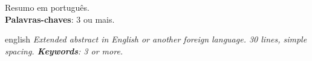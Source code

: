 \documentclass[12pt,openright,oneside,a4paper,english,french,spanish,brazil]{unifil}
\begin{document}
\par
\begin{resumo}
Resumo em português.
\vspace{\onelineskip} \\
\noindent
\textbf{Palavras-chaves}: 3 ou mais.
\end{resumo}

\par
\begin{resumo}[Abstract]
\begin{otherlanguage*}{english}
\emph{
Extended abstract in English or another foreign language. 30 lines, simple spacing. \citeyear{ABNTEX2:2014}
}
\vspace{\onelineskip}
\noindent
\emph{	
\textbf{Keywords}: 3 or more.
}
\end{otherlanguage*}
\end{resumo}


\tableofcontents*

  \setlength\absleftindent{0cm}
  \setlength\absrightindent{0cm}
  
  \abstracttextfont{\normalfont\normalsize}

  \setlength{\absparindent}{0pt}
  \setlength{\absparsep}{18pt}


\textual

\renewcommand{\ABNTEXchapterfont}{\fontfamily{cmr}\fontseries{b}\selectfont}
\renewcommand{\ABNTEXchapterfontsize}{\Large}

\renewcommand{\ABNTEXsectionfont}{\uppercase{\fontfamily{cmr}\fontseries{b}\selectfont}}
\renewcommand{\ABNTEXsectionfontsize}{\large}
\end{document}
